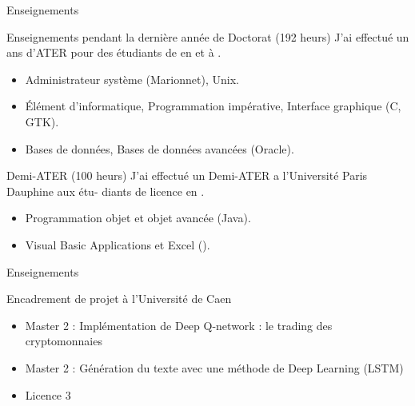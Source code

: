 \begin{frame}{Enseignements}

\begin{block}{Enseignements pendant la dernière année de Doctorat (192 heurs)}
J’ai effectué un ans d’ATER pour des étudiants de 
 en  et  à %
.
\begin{itemize}
 \item Administrateur système (Marionnet), Unix.
 \item Élément d'informatique, Programmation impérative, Interface graphique (C, GTK).
 \item Bases de données, Bases de données avancées (Oracle).
\end{itemize}
\end{block}
\begin{block}{Demi-ATER (100 heurs)}
J’ai effectué un Demi-ATER a l’Université Paris Dauphine aux étu-
diants de licence en . 
\begin{itemize} 
\item Programmation objet et objet avancée (Java).
\item Visual Basic Applications et Excel ().
\end{itemize}
%
\end{block}
\end{frame}

\begin{frame}{Enseignements} 
\begin{block}{Encadrement de projet à l'Université de Caen}
\begin{itemize}
 \item  Master 2 : Implémentation de Deep Q-network : le trading des cryptomonnaies
 \item Master 2 : Génération du texte avec une méthode de Deep Learning (LSTM)
 \item Licence 3
\end{itemize}
\end{block}


\end{frame}


